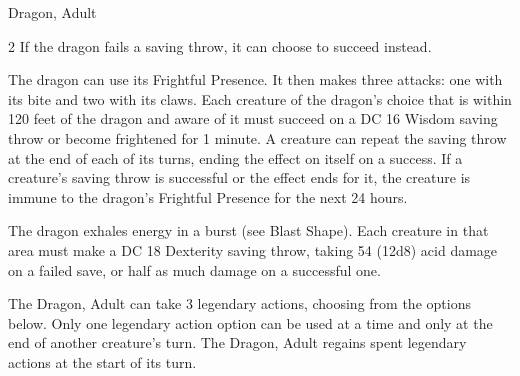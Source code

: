 \begin{DndMonster}[width=\textwidth + 8pt]{Dragon, Adult}
\begin{multicols}{2}
 If the dragon fails a saving throw, it can choose to succeed instead.

 The dragon can use its Frightful Presence. It then makes three attacks: one with its bite and two with its claws.
\DndMonsterAttack[
	name=Bite,
	distance=melee,
	type=weapon,
	mod=+11,
	reach=10,
	dmg=\DndDice{2d10 + 6},
	dmg-type=piercing,
	extra={ plus 4 (1d8) damage of the dragon's Damage Type.}
]
\DndMonsterAttack[
	name=Claw,
	distance=melee,
	type=weapon,
	mod=+11,
	reach=5,
	dmg=\DndDice{2d6 + 6},
	dmg-type=slashing
]
\DndMonsterAttack[
	name=Tail,
	distance=melee,
	type=weapon,
	mod=+11,
	reach=15,
	dmg=\DndDice{2d8 + 6},
	dmg-type=bludgeoning
]
Each creature of the dragon's choice that is within 120 feet of the dragon and aware of it must succeed on a DC 16 Wisdom saving throw or become frightened for 1 minute. A creature can repeat the saving throw at the end of each of its turns, ending the effect on itself on a success. If a creature's saving throw is successful or the effect ends for it, the creature is immune to the dragon's Frightful Presence for the next 24 hours.

The dragon exhales energy in a burst (see Blast Shape). Each creature in that area must make a DC 18 Dexterity saving throw, taking 54 (12d8) acid damage on a failed save, or half as much damage on a successful one.

The Dragon, Adult can take 3 legendary actions, choosing from the options below. Only one legendary action option can be used at a time and only at the end of another creature's turn. The Dragon, Adult regains spent legendary actions at the start of its turn.
\begin{DndMonsterLegendaryActions}
\end{DndMonsterLegendaryActions}
\end{multicols}
\end{DndMonster}

